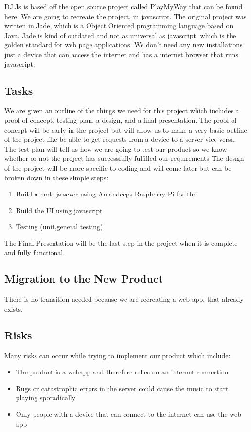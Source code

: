 \documentclass[12pt, titlepage]{article}
\begin{document}
DJ.Js is based off the open source project called \href{https://github.com/malithsen/playmyway}{PlayMyWay that can be found here.} We are going to recreate the project, in javascript. The original project was written in Jade, which is a Object Oriented programming language based on Java. Jade is kind of outdated and not as universal as javascript, which is the golden standard for web page applications. We don't need any new installations just a device that can access the internet and has a internet browser that runs javascript.

\subsection{Tasks}

We are given an outline of the things we need for this project which includes a proof of concept, testing plan, a design, and a final presentation. The proof of concept will be early in the project but will allow us to make a very basic outline of the project like be able to get requests from a device to a server vice versa. The test plan will tell us how we are going to test our product so we know whether or not the project has successfully fulfilled our requirements The design of the project will be more specific to coding and will come later but can be broken down in these simple steps:
\begin{enumerate}
\item Build a node.js sever using Amandeeps Raspberry Pi for the
\item Build the UI using javascript
\item Testing (unit,general testing)
\end{enumerate}
The Final Presentation will be the last step in the project when it is complete and fully functional.
\subsection{Migration to the New Product}

There is no transition needed because we are recreating a web app, that already exists.

\subsection{Risks}

Many risks can occur while trying to implement our product which include:
\begin{itemize}
\item The product is a webapp and therefore relies on an internet connection
\item Bugs or catastrophic errors in the server could cause the music to start playing sporadically
\item Only people with a device that can connect to the internet can use the web app
\end{itemize}
\end{document}
